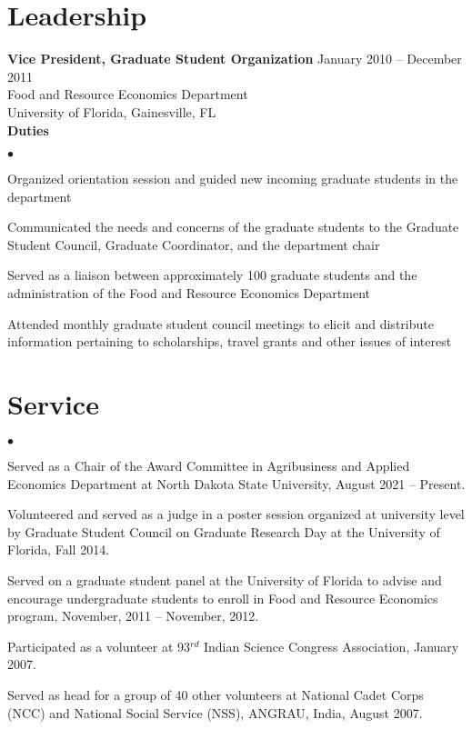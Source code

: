 \documentclass[margin,line]{res}
\newenvironment{list2}{
  \begin{list}{$\bullet$}{%
    \setlength{\itemsep}{0in}
    \setlength{\parsep}{0in} \setlength{\parskip}{0in}
    \setlength{\topsep}{0in} \setlength{\partopsep}{0in}
    \setlength{\leftmargin}{0.2in}}}{\end{list}}
\begin{document}
\begin{resume}
\section{\sc Leadership}
{\bf Vice President, Graduate Student Organization} \hfill{January 2010 -- December 2011} \\
Food and Resource Economics Department \\
University of Florida, Gainesville, FL\\
{\bf Duties}
\begin{list2}
\item Organized orientation session and guided new incoming graduate students in the department
\item Communicated the needs and concerns of the graduate students to the Graduate Student Council, Graduate Coordinator, and the department chair
\item Served as a liaison between approximately 100 graduate students and the administration of the Food and Resource Economics Department
\item Attended monthly graduate student council meetings to elicit and distribute information pertaining to scholarships, travel grants and other issues of interest
\end{list2}


\section{\sc Service}
\begin{list2}
\item Served as a Chair of the Award Committee in Agribusiness and Applied Economics Department at North Dakota State University, August 2021 -- Present.
\item Volunteered and served as a judge in a poster session organized at university level by Graduate Student Council on Graduate Research Day at the University of Florida, Fall 2014.
\item Served on a graduate student panel at the University of Florida to advise and encourage undergraduate students to enroll in Food and Resource Economics program, November, 2011 -- November, 2012.
\item Participated as a volunteer at 93$^{rd}$ Indian Science Congress Association, January 2007.
\item Served as head for a group of 40 other volunteers at National Cadet Corps (NCC) and National Social Service (NSS), ANGRAU, India, August 2007.
\end{list2}


\end{resume}
\end{document}
